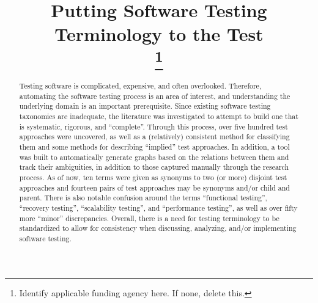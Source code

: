 \documentclass[conference]{IEEEtran}
\begin{document}
\title{Putting Software Testing Terminology to the Test\\
    \thanks{Identify applicable funding agency here. If none, delete this.}
}

\author{
    }



\maketitle

\begin{abstract}
    Testing software is complicated, expensive, and often overlooked. Therefore,
    automating the software testing process is an area of interest, and
    understanding the underlying domain is an important prerequisite. Since
    existing software testing taxonomies are inadequate, the literature was
    investigated to attempt to build one that is systematic, rigorous, and
    ``complete''. Through this process, over five hundred test approaches were
    uncovered, as well as a (relatively) consistent method for classifying
    them and some methods for describing ``implied'' test approaches. In
    addition, a tool was built to automatically generate graphs based on the
    relations between them and track their ambiguities, in addition to those
    captured manually through the research process. As of now, ten terms were
    given as synonyms to two (or more) disjoint test approaches and fourteen
    pairs of test approaches may be synonyms and/or child and parent. There is
    also notable confusion around the terms ``functional testing'', ``recovery
    testing'', ``scalability testing'', and ``performance testing'', as well as
    over fifty more ``minor'' discrepancies. Overall, there is a need for
    testing terminology to be standardized to allow for consistency when
    discussing, analyzing, and/or implementing software testing.
\end{abstract}
\end{document}
